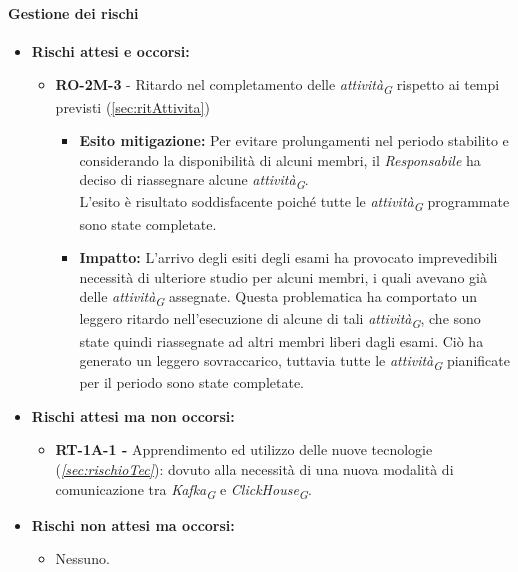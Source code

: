 \paragraph{Gestione dei rischi} 

\begin{itemize}
    \item \textbf{Rischi attesi e occorsi:}
\begin{itemize}
    \item \textbf{RO-2M-3} - Ritardo nel completamento delle \textit{attività}\textsubscript{\textit{G}} rispetto ai tempi previsti (\ref{sec:ritAttivita})
    \begin{itemize}
        \item \textbf{Esito mitigazione:} 
        Per evitare prolungamenti nel periodo stabilito e considerando la disponibilità di alcuni membri, il \textit{Responsabile} ha deciso di riassegnare alcune \textit{attività}\textsubscript{\textit{G}}. \\
        L'esito è risultato soddisfacente poiché tutte le \textit{attività}\textsubscript{\textit{G}} programmate sono state completate.
        \item \textbf{Impatto:}
        L'arrivo degli esiti degli esami ha provocato imprevedibili necessità di ulteriore studio per alcuni membri, i quali avevano già delle \textit{attività}\textsubscript{\textit{G}} assegnate. Questa problematica ha comportato un leggero ritardo nell'esecuzione di alcune di tali \textit{attività}\textsubscript{\textit{G}}, che sono state quindi riassegnate ad altri membri liberi dagli esami. Ciò ha generato un leggero sovraccarico, tuttavia tutte le \textit{attività}\textsubscript{\textit{G}} pianificate per il periodo sono state completate.
    \end{itemize}
\end{itemize}
\item \textbf{Rischi attesi ma non occorsi:}
 \begin{itemize}
    \item  \textbf{RT-1A-1 -} Apprendimento ed utilizzo delle nuove tecnologie (\textit{\ref{sec:rischioTec}}): dovuto alla necessità di una nuova modalità di comunicazione tra \textit{Kafka}\textsubscript{\textit{G}} e \textit{ClickHouse}\textsubscript{\textit{G}}.
\end{itemize}
\item \textbf{Rischi non attesi ma occorsi:}
\begin{itemize}
    \item Nessuno.
\end{itemize}
\end{itemize}

